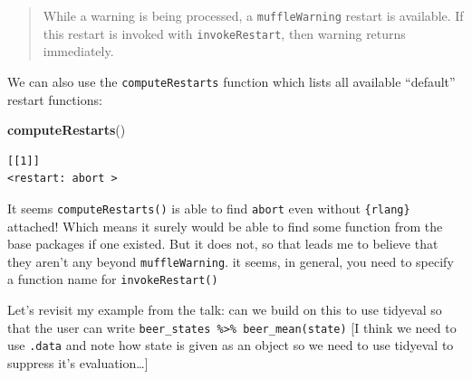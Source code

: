 \documentclass[]{book}
\newenvironment{Shaded}{\begin{snugshade}}{\end{snugshade}}
\newcommand{\KeywordTok}[1]{\textcolor[rgb]{0.13,0.29,0.53}{\textbf{#1}}}
\newcommand{\NormalTok}[1]{#1}
\begin{document}
\begin{quote}
While a warning is being processed, a \texttt{muffleWarning} restart is available. If this restart is invoked with \texttt{invokeRestart}, then warning returns immediately.
\end{quote}

We can also use the \texttt{computeRestarts} function which lists all available ``default'' restart functions:

\begin{Shaded}
\begin{Highlighting}[]
\KeywordTok{computeRestarts}\NormalTok{()}
\end{Highlighting}
\end{Shaded}

\begin{verbatim}
[[1]]
<restart: abort >
\end{verbatim}

It seems \texttt{computeRestarts()} is able to find \texttt{abort} even without \texttt{\{rlang\}} attached! Which means it surely would be able to find some function from the base packages if one existed. But it does not, so that leads me to believe that they aren't any beyond \texttt{muffleWarning}. it seems, in general, you need to specify a function name for \texttt{invokeRestart()}

Let's revisit my example from the talk: can we build on this to use tidyeval so that the user can write \texttt{beer\_states\ \%\textgreater{}\%\ beer\_mean(state)} {[}I think we need to use \texttt{.data} and note how state is given as an object so we need to use tidyeval to suppress it's evaluation\ldots{}{]}
\end{document}
